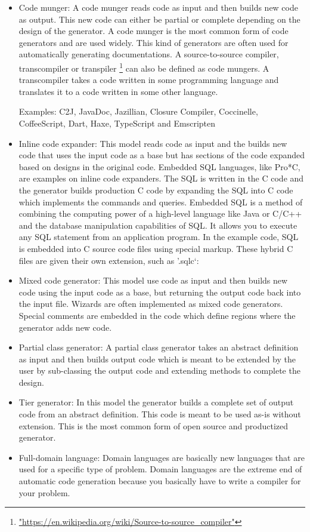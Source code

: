 \begin{itemize}
\item Code munger: A code munger reads code as input and then builds new code as output. This new code can either be partial or complete depending on the design of the generator.
A code munger is the most common form of code generators and are used widely. This kind of generators are often used for automatically generating documentations.
A source-to-source compiler, transcompiler or transpiler \footnote{\url{"https://en.wikipedia.org/wiki/Source-to-source_compiler"}} can also be defined as code mungers. A transcompiler takes a code written in some programming language and translates it to a code written in some other language.

Examples:  C2J, JavaDoc, Jazillian, Closure Compiler, Coccinelle, CoffeeScript, Dart, Haxe, TypeScript and Emscripten



\item Inline code expander: This model reads code as input and the builds new code that uses the input code as a base but has sections of the code expanded based on designs in the original code. Embedded SQL languages, like Pro*C, are examples on inline code expanders. The SQL is written in the C code and the generator builds production C code by expanding the SQL into C code which implements the commands and queries.
Embedded SQL is a method of combining the computing power of a high-level language like Java or C/C++ and the database manipulation capabilities of SQL. 
It allows you to execute any SQL statement from an application program. 
In the example code, SQL is embedded into C source code files using special markup. These hybrid C files are given their own extension, such as '.sqlc‘:
 

\item Mixed code generator: This model use code as input and then builds new code using the input code as a base, but returning the output code back into the input file. Wizards are often implemented as mixed code generators. Special comments are embedded in the code which define regions where the generator adds new code. 

\item Partial class generator: A partial class generator takes an abstract definition as input and then builds output code which is meant to be extended by the user by sub-classing the output code and extending methods to complete the design. 

\item Tier generator: In this model the generator builds a complete set of output code from an abstract definition. This code is meant to be used as-is without extension. This is the most common form of open source and productized generator.

\item Full-domain language: Domain languages are basically new languages that are used for a specific type of problem.  Domain languages are the extreme end of automatic code generation because you basically have to write a compiler for your problem. 

\end{itemize}
